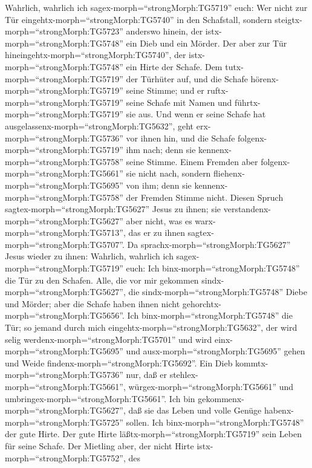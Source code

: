  Wahrlich, wahrlich ich sagex-morph=``strongMorph:TG5719''
euch: Wer nicht zur Tür eingehtx-morph=``strongMorph:TG5740'' in den
Schafstall, sondern steigtx-morph=``strongMorph:TG5723'' anderswo
hinein, der istx-morph=``strongMorph:TG5748'' ein Dieb und ein Mörder.
 Der aber zur Tür hineingehtx-morph=``strongMorph:TG5740'',
der istx-morph=``strongMorph:TG5748'' ein Hirte der Schafe. 
Dem tutx-morph=``strongMorph:TG5719'' der Türhüter auf, und die Schafe
hörenx-morph=``strongMorph:TG5719'' seine Stimme; und er
ruftx-morph=``strongMorph:TG5719'' seine Schafe mit Namen und
führtx-morph=``strongMorph:TG5719'' sie aus.  Und wenn er
seine Schafe hat ausgelassenx-morph=``strongMorph:TG5632'', geht
erx-morph=``strongMorph:TG5736'' vor ihnen hin, und die Schafe
folgenx-morph=``strongMorph:TG5719'' ihm nach; denn sie
kennenx-morph=``strongMorph:TG5758'' seine Stimme.  Einem
Fremden aber folgenx-morph=``strongMorph:TG5661'' sie nicht nach,
sondern fliehenx-morph=``strongMorph:TG5695'' von ihm; denn sie
kennenx-morph=``strongMorph:TG5758'' der Fremden Stimme nicht.
 Diesen Spruch sagtex-morph=``strongMorph:TG5627'' Jesus zu
ihnen; sie verstandenx-morph=``strongMorph:TG5627'' aber nicht, was es
warx-morph=``strongMorph:TG5713'', das er zu ihnen
sagtex-morph=``strongMorph:TG5707''.  Da
sprachx-morph=``strongMorph:TG5627'' Jesus wieder zu ihnen: Wahrlich,
wahrlich ich sagex-morph=``strongMorph:TG5719'' euch: Ich
binx-morph=``strongMorph:TG5748'' die Tür zu den Schafen. 
Alle, die vor mir gekommen sindx-morph=``strongMorph:TG5627'', die
sindx-morph=``strongMorph:TG5748'' Diebe und Mörder; aber die Schafe
haben ihnen nicht gehorchtx-morph=``strongMorph:TG5656''. 
Ich binx-morph=``strongMorph:TG5748'' die Tür; so jemand durch mich
eingehtx-morph=``strongMorph:TG5632'', der wird selig
werdenx-morph=``strongMorph:TG5701'' und wird
einx-morph=``strongMorph:TG5695'' und ausx-morph=``strongMorph:TG5695''
gehen und Weide findenx-morph=``strongMorph:TG5692''.  Ein
Dieb kommtx-morph=``strongMorph:TG5736'' nur, daß er
stehlex-morph=``strongMorph:TG5661'',
würgex-morph=``strongMorph:TG5661'' und
umbringex-morph=``strongMorph:TG5661''.  Ich bin
gekommenx-morph=``strongMorph:TG5627'', daß sie das Leben und volle
Genüge habenx-morph=``strongMorph:TG5725'' sollen.  Ich
binx-morph=``strongMorph:TG5748'' der gute Hirte. Der gute Hirte
läßtx-morph=``strongMorph:TG5719'' sein Leben für seine Schafe. Der
Mietling aber, der nicht Hirte istx-morph=``strongMorph:TG5752'', des
